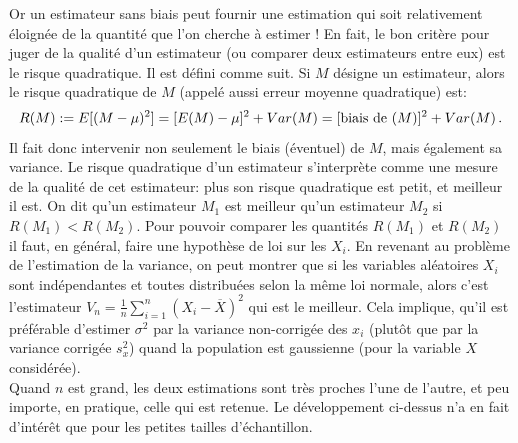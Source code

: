 \documentclass[12pt, a4paper]{book}
\numberwithin{equation}{section}
\begin{document}
\smallskip\noindent
Or un estimateur sans biais peut fournir une estimation qui soit relativement éloignée de la quantité 
que l'on cherche à estimer ! En fait, le bon critère pour juger de la qualité d'un estimateur 
(ou comparer deux estimateurs entre eux) est le risque quadratique. Il est défini comme suit. 
Si $M$ désigne un estimateur, alors le risque quadratique de $M$ (appelé aussi erreur moyenne quadratique) est:
$$
R(M) := E[(M-\mu)^2] = [E(M)-\mu]^2 + Var(M) =[\hbox{biais de }(M)]^2 + Var(M) \, . 
$$ 
Il  fait donc intervenir non seulement le biais (éventuel) de $M$, mais également sa variance.
Le risque quadratique  d'un estimateur s'interprète comme une mesure de la qualité de cet estimateur:
plus son risque  quadratique  est petit, et meilleur il est. On dit qu'un estimateur
$M_1$ est meilleur qu'un estimateur $M_2$ si $R(M_1) <  R(M_2)$. Pour pouvoir comparer
les quantités  $R(M_1)$ et  $R(M_2)$ il faut, en général, faire une hypothèse de loi sur les $X_i$.
En revenant au problème de l'estimation de la variance, on peut montrer que si les variables aléatoires 
$X_i$ sont indépendantes et toutes distribuées selon la même loi normale, alors c'est l'estimateur   
$V_n = \frac 1n \sum_{i=1}^n (X_i - \overline{X})^2$ qui est le meilleur. Cela implique,
qu'il est préférable d'estimer $\sigma^2$ par la variance non-corrigée des $x_i$ (plutôt que par la variance corrigée $s_x^2$)
quand la population est gaussienne (pour la variable $X$ considérée).\\

Quand $n$ est grand, les deux estimations sont très proches l'une
de l'autre, et peu importe, en pratique, celle qui est retenue. Le développement ci-dessus n'a en fait 
d'intérêt que pour les petites tailles d'échantillon.
\end{document}
